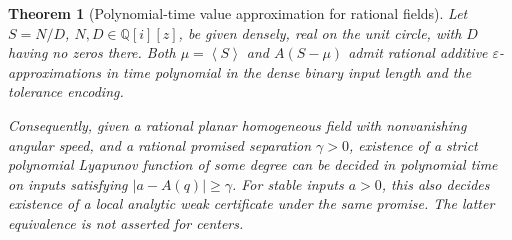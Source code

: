 \documentclass[11pt,a4paper]{article}
\newtheorem{theorem}{Theorem}[section]
\theoremstyle{remark}\newtheorem{remark}[theorem]{Remark}
\newcommand{\av}[1]{\left\langle #1\right\rangle}
\begin{document}
\begin{theorem}[Polynomial-time value approximation for rational fields]
\label{thm:rationalcomplexity}
Let \(S=N/D\), \(N,D\in\mathbb Q[i][z]\), be given densely,
real on the unit circle, with \(D\) having no zeros there.
Both \(\mu=\av{S}\) and \(A(S-\mu)\) admit rational additive
\(\varepsilon\)-approximations in time polynomial in the dense
binary input length and the tolerance encoding.

Consequently, given a rational planar homogeneous field with
nonvanishing angular speed, and a rational promised separation
\(\gamma>0\), existence of a strict polynomial Lyapunov function
of some degree can be decided in polynomial time on inputs satisfying
\(|a-A(q)|\geq\gamma\). For stable inputs \(a>0\), this also
decides existence of a local analytic weak certificate under the
same promise. The latter equivalence is not asserted for centers.
\end{theorem}
\end{document}
